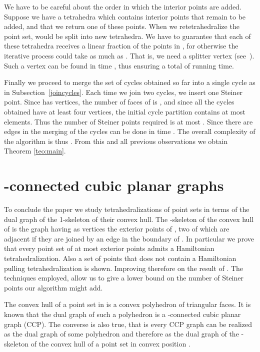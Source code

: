 \documentclass{article}
\begin{document}
We have to be careful about the order 
in which the interior points are added.
Suppose we have a tetrahedra  which contains  
interior points that remain to be added, and that 
we return one of these points.  When we 
retetrahedralize the point set,  would be 
split  into  new tetrahedra.
We have to guarantee that each of these tetrahedra 
receives a linear fraction of the points
in , for otherwise the 
iterative process could take as much as 
. That is, we need a splitter vertex (see~\cite{avis}).
Such a vertex can be found in time , thus ensuring a 
total of  running time.\par

Finally we proceed to merge the set of cycles obtained so
far into a single cycle as in Subsection~\ref{joincycles}.
Each time we join two cycles, we insert one Steiner point.
Since  has  vertices, the number of faces of 
is , and since all the cycles obtained have at least
four vertices, the initial cycle partition contains at most 
 elements. Thus the number of
Steiner points required is at most .
Since there are  edges 
in  the merging of the cycles can be done in time .
The overall complexity of the algorithm is thus 
. From this and all previous observations
we obtain Theorem \ref{teo:main}.\par




\section{-connected cubic planar graphs}\label{section:3ccp}

To conclude the paper we study tetrahedralizations of 
point sets in terms of the dual graph of
the 1-skeleton of their convex hull. The -skeleton of 
the convex hull of  is the graph having as vertices
the exterior points of , two of which are adjacent
if they are joined by an edge in the boundary of .
 In particular
we prove that every point set of at most  exterior
points admits a Hamiltonian tetrahedralization. Also
a set of  points that does not contain a Hamiltonian pulling tetrahedralization
is shown. Improving therefore on the result of \cite{isora}. 
The techniques employed, allow us to give a lower bound on the number
of Steiner points our algorithm might add.\par

The convex hull of a point set in  
is a convex polyhedron of triangular faces. It is known that 
the dual graph of such a polyhedron is a -connected cubic planar graph (CCP).
The converse is also true, that is every  CCP graph can be
realized as the dual graph of some polyhedron and therefore as the 
dual graph of the -skeleton of the convex hull of a point set in convex
position  \cite{steinitz}.\par
\end{document}
